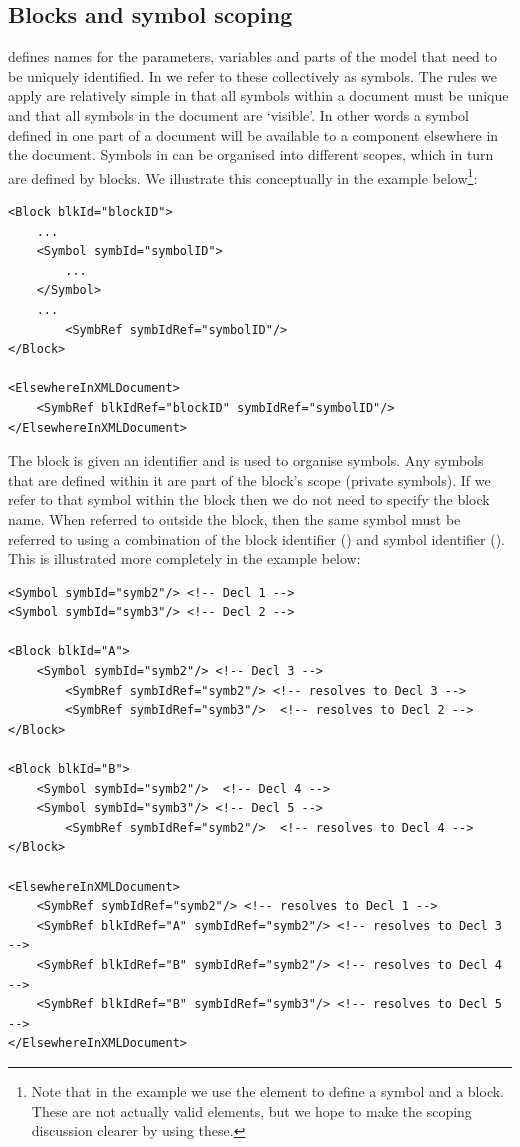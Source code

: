 \subsection{Blocks and symbol scoping}
\label{sec:blocks}
\label{sec:scoping-rules}

\pharmml defines names for the
parameters, variables and parts of the model that need to be uniquely
identified. In \pharmml we refer to these collectively as symbols. The
rules we apply are relatively simple in that all symbols within a
\pharmml document must be unique and that all symbols in the document are
`visible'. In other words a symbol defined in one part of a document
will be available to a component elsewhere in the document. Symbols in
\pharmml can be organised into different scopes, which in turn are
defined by blocks. We illustrate this conceptually in the example
below\footnote{Note that in the example we use the element
   to define a symbol and  a block. These
  are not actually valid \pharmml elements, but we hope to make the
  scoping discussion clearer by using these.}:

\lstset{language=XML}
\begin{lstlisting}
<Block blkId="blockID">
	...
	<Symbol symbId="symbolID">
		...
	</Symbol>
	...
        <SymbRef symbIdRef="symbolID"/>
</Block>

<ElsewhereInXMLDocument>
	<SymbRef blkIdRef="blockID" symbIdRef="symbolID"/>
</ElsewhereInXMLDocument>
\end{lstlisting}
The block is given an identifier and is used to organise symbols. Any
symbols that are defined within it are part of the block's scope (private symbols). If
we refer to that symbol within the block then we do not need to specify the
block name. When referred to outside the block, then the same symbol
must be referred to using a combination of the block identifier
() and symbol identifier (). This is illustrated
more completely in the example below:

\lstset{language=XML}
\begin{lstlisting}
<Symbol symbId="symb2"/> <!-- Decl 1 -->
<Symbol symbId="symb3"/> <!-- Decl 2 -->

<Block blkId="A">
	<Symbol symbId="symb2"/> <!-- Decl 3 -->
        <SymbRef symbIdRef="symb2"/> <!-- resolves to Decl 3 -->
        <SymbRef symbIdRef="symb3"/>  <!-- resolves to Decl 2 -->
</Block>

<Block blkId="B">
	<Symbol symbId="symb2"/>  <!-- Decl 4 -->
	<Symbol symbId="symb3"/> <!-- Decl 5 -->
        <SymbRef symbIdRef="symb2"/>  <!-- resolves to Decl 4 -->
</Block>

<ElsewhereInXMLDocument>
	<SymbRef symbIdRef="symb2"/> <!-- resolves to Decl 1 -->
	<SymbRef blkIdRef="A" symbIdRef="symb2"/> <!-- resolves to Decl 3 -->
	<SymbRef blkIdRef="B" symbIdRef="symb2"/> <!-- resolves to Decl 4 -->
	<SymbRef blkIdRef="B" symbIdRef="symb3"/> <!-- resolves to Decl 5 -->
</ElsewhereInXMLDocument>
\end{lstlisting}

